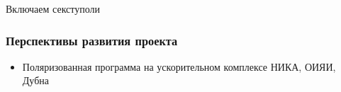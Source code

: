 \documentclass[14pt]{beamer}
\begin{document}
\begin{frame}{Включаем секступоли}
\end{frame}
\begin{frame}
\frametitle{Перспективы развития проекта}
\begin{itemize}
  \item Поляризованная программа на ускорительном комплексе НИКА, ОИЯИ, Дубна
\end{itemize}
\end{frame}
\end{document}
